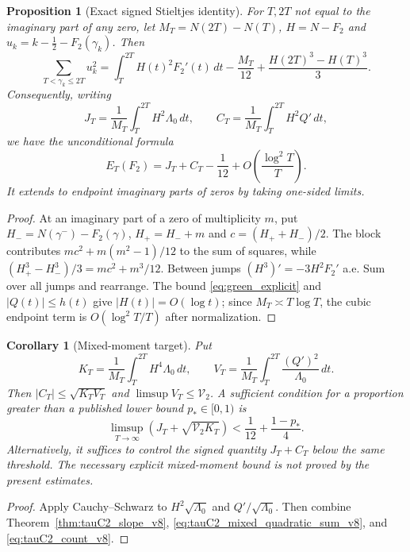 \documentclass[11pt,reqno]{amsart}
\numberwithin{equation}{section}
\newtheorem{proposition}[theorem]{Proposition}
\newtheorem{corollary}[theorem]{Corollary}
\theoremstyle{definition}
\theoremstyle{remark}
\begin{document}
\begin{proposition}[Exact signed Stieltjes identity]
\label{prop:tauC2_exact_quadratic_sum_v8}
For $T,2T$ not equal to the imaginary part of any zero, let
$M_T=N(2T)-N(T)$, $H=N-F_2$ and
$u_k=k-\frac12-F_2(\gamma_k)$. Then
\begin{equation}
 \boxed{\displaystyle
 \sum_{T<\gamma_k\le2T}u_k^2=
 \int_T^{2T}H(t)^2F_2'(t)\,dt
 -\frac{M_T}{12}
 +\frac{H(2T)^3-H(T)^3}{3}.}
 \label{eq:tauC2_exact_quadratic_sum_v8}
\end{equation}
Consequently, writing
\[
 J_T=\frac1{M_T}\int_T^{2T}H^2\Lambda_0\,dt,\qquad
 C_T=\frac1{M_T}\int_T^{2T}H^2Q'\,dt,
\]
we have the unconditional formula
\begin{equation}
 E_T(F_2)=J_T+C_T-\frac1{12}
 +O\!\left(\frac{\log^2T}{T}\right).
 \label{eq:tauC2_mixed_quadratic_sum_v8}
\end{equation}
It extends to endpoint imaginary parts of zeros by taking one-sided limits.
\end{proposition}
\begin{proof}
At an imaginary part of a zero of multiplicity $m$, put
$H_-=N(\gamma^-)-F_2(\gamma)$,
$H_+=H_-+m$ and $c=(H_++H_-)/2$.
The block contributes
$mc^2+m(m^2-1)/12$ to the sum of squares, while
$(H_+^3-H_-^3)/3=mc^2+m^3/12$.
Between jumps $(H^3)'=-3H^2F_2'$ a.e.
Sum over all jumps and rearrange.
The bound \eqref{eq:green_explicit} and $|Q(t)|\le h(t)$
give $|H(t)|=O(\log t)$; since $M_T\asymp T\log T$,
the cubic endpoint term is $O(\log^2T/T)$ after
normalization.
\end{proof}

\begin{corollary}[Mixed-moment target]
\label{cor:tauC2_target_v8}
Put
\[
K_T=\frac1{M_T}\int_T^{2T}H^4\Lambda_0\,dt,\qquad
V_T=\frac1{M_T}\int_T^{2T}\frac{(Q')^2}{\Lambda_0}\,dt.
\]
Then $|C_T|\le\sqrt{K_TV_T}$ and
$\limsup V_T\le\mathcal V_2$. A sufficient
condition for a proportion greater than a
published lower bound $p_*\in[0,1)$ is
\begin{equation}
\limsup_{T\to\infty}
(J_T+\sqrt{\mathcal V_2K_T})
<\frac1{12}+\frac{1-p_*}{4}.
\label{eq:tauC2_target_v8}
\end{equation}
Alternatively, it suffices to control the signed
quantity $J_T+C_T$ below the same threshold.
The necessary explicit mixed-moment bound
is not proved by the present estimates.
\end{corollary}

\begin{proof}
Apply Cauchy--Schwarz to
$H^2\sqrt{\Lambda_0}$ and $Q'/\sqrt{\Lambda_0}$.
Then combine Theorem~\ref{thm:tauC2_slope_v8},
\eqref{eq:tauC2_mixed_quadratic_sum_v8}, and
\eqref{eq:tauC2_count_v8}.
\end{proof}
\end{document}
